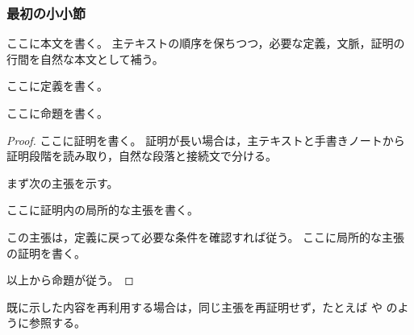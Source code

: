 \subsubsection{最初の小小節}

ここに本文を書く。
主テキストの順序を保ちつつ，必要な定義，文脈，証明の行間を自然な本文として補う。

\begin{dfn}[定義 1.1]
ここに定義を書く。
\end{dfn}

\begin{prop}[命題 1.2]
ここに命題を書く。
\end{prop}

\begin{proof}
ここに証明を書く。
証明が長い場合は，主テキストと手書きノートから証明段階を読み取り，自然な段落と接続文で分ける。

まず次の主張を示す。

\begin{claim}
ここに証明内の局所的な主張を書く。
\end{claim}

この主張は，定義に戻って必要な条件を確認すれば従う。
ここに局所的な主張の証明を書く。\localqed

以上から命題が従う。
\end{proof}

\begin{rmk}
既に示した内容を再利用する場合は，同じ主張を再証明せず，たとえば  や  のように参照する。
\end{rmk}
